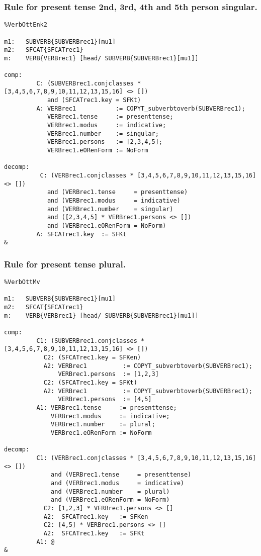 \subsubsection{Rule for present tense 2nd, 3rd, 4th and 5th person singular.}
\begin{verbatim}
%VerbOttEnk2

m1:   SUBVERB{SUBVERBrec1}[mu1]
m2:   SFCAT{SFCATrec1}
m:    VERB{VERBrec1} [head/ SUBVERB{SUBVERBrec1}[mu1]]

comp:        
         C: (SUBVERBrec1.conjclasses * [3,4,5,6,7,8,9,10,11,12,13,15,16] <> [])
            and (SFCATrec1.key = SFKt)
         A: VERBrec1           := COPYT_subverbtoverb(SUBVERBrec1);
            VERBrec1.tense     := presenttense;
            VERBrec1.modus     := indicative;
            VERBrec1.number    := singular;
            VERBrec1.persons   := [2,3,4,5];
            VERBrec1.eORenForm := NoForm

decomp:      
          C: (VERBrec1.conjclasses * [3,4,5,6,7,8,9,10,11,12,13,15,16] <> []) 
            and (VERBrec1.tense     = presenttense)
            and (VERBrec1.modus     = indicative)
            and (VERBrec1.number    = singular)
            and ([2,3,4,5] * VERBrec1.persons <> [])
            and (VERBrec1.eORenForm = NoForm)
         A: SFCATrec1.key  := SFKt
&
\end{verbatim}
\newpage
\subsubsection{Rule for present tense plural.}
\begin{verbatim}
%VerbOttMv

m1:   SUBVERB{SUBVERBrec1}[mu1]
m2:   SFCAT{SFCATrec1}
m:    VERB{VERBrec1} [head/ SUBVERB{SUBVERBrec1}[mu1]]

comp:
         C1: (SUBVERBrec1.conjclasses * [3,4,5,6,7,8,9,10,11,12,13,15,16] <> [])
           C2: (SFCATrec1.key = SFKen)
           A2: VERBrec1          := COPYT_subverbtoverb(SUBVERBrec1);
               VERBrec1.persons  := [1,2,3]
           C2: (SFCATrec1.key = SFKt)
           A2: VERBrec1          := COPYT_subverbtoverb(SUBVERBrec1);
               VERBrec1.persons  := [4,5]
         A1: VERBrec1.tense     := presenttense;
             VERBrec1.modus     := indicative;
             VERBrec1.number    := plural;
             VERBrec1.eORenForm := NoForm

decomp:
         C1: (VERBrec1.conjclasses * [3,4,5,6,7,8,9,10,11,12,13,15,16] <> [])
             and (VERBrec1.tense     = presenttense) 
             and (VERBrec1.modus     = indicative)
             and (VERBrec1.number    = plural)
             and (VERBrec1.eORenForm = NoForm)
           C2: [1,2,3] * VERBrec1.persons <> []
           A2:  SFCATrec1.key   := SFKen
           C2: [4,5] * VERBrec1.persons <> []
           A2:  SFCATrec1.key   := SFKt
         A1: @
&
\end{verbatim}
\newpage
